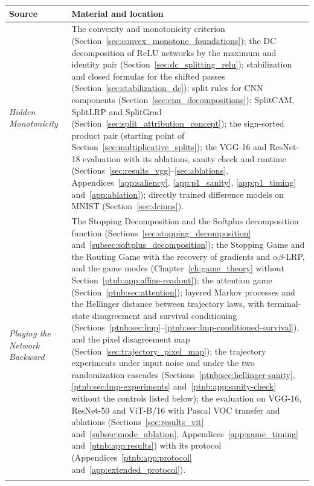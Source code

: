 \begin{table}[htbp]
\centering\small
\begin{tabularx}{\linewidth}{@{}>{\raggedright\arraybackslash}p{3.2cm}>{\raggedright\arraybackslash}X@{}}
\toprule
Source & Material and location \\
\midrule
\emph{Hidden Monotonicity}~\parencite{hiddenMono} & The convexity and monotonicity criterion (Section~\ref{sec:convex_monotone_foundations}); the DC decomposition of ReLU networks by the maximum and identity pair (Section~\ref{sec:dc_splitting_relu}); stabilization and closed formulas for the shifted passes (Section~\ref{sec:stabilization_dc}); split rules for CNN components (Section~\ref{sec:cnn_decompositions}); SplitCAM, SplitLRP and SplitGrad (Section~\ref{sec:split_attribution_concept}); the sign-sorted product pair (starting point of Section~\ref{sec:multiplicative_splits}); the VGG-16 and ResNet-18 evaluation with its ablations, sanity check and runtime (Sections~\ref{sec:results_vgg}--\ref{sec:ablations}, Appendices~\ref{app:saliency}, \ref{app:p1_sanity}, \ref{app:p1_timing} and~\ref{app:ablation}); directly trained difference models on MNIST (Section~\ref{sec:dcinns}). \\
\addlinespace
\emph{Playing the Network Backward}~\parencite{playingBackward2026} & The Stopping Decomposition and the Softplus decomposition function (Sections~\ref{sec:stopping_decomposition} and~\ref{subsec:softplus_decomposition}); the Stopping Game and the Routing Game with the recovery of gradients and $\alpha\beta$-LRP, and the game modes (Chapter~\ref{ch:game_theory} without Section~\ref{ptnb:app:affine-readout}); the attention game (Section~\ref{ptnb:sec:attention}); layered Markov processes and the Hellinger distance between trajectory laws, with terminal-state disagreement and survival conditioning (Sections~\ref{ptnb:sec:lmp}--\ref{ptnb:sec:lmp-conditioned-survival}), and the pixel disagreement map (Section~\ref{sec:trajectory_pixel_map}); the trajectory experiments under input noise and under the two randomization cascades (Sections~\ref{ptnb:sec:hellinger-sanity}, \ref{ptnb:sec:lmp-experiments} and~\ref{ptnb:app:sanity-check} without the controls listed below); the evaluation on VGG-16, ResNet-50 and ViT-B/16 with Pascal VOC transfer and ablations (Sections~\ref{sec:results_vit} and~\ref{subsec:mode_ablation}, Appendices~\ref{app:game_timing} and~\ref{ptnb:app:results}) with its protocol (Appendices~\ref{ptnb:app:protocol} and~\ref{app:extended_protocol}). \\
\addlinespace

\end{tabularx}
\end{table}
